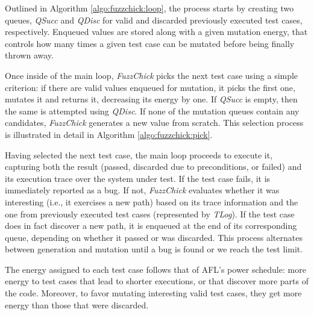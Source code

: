 \documentclass[sigconf, anonymous]{acmart}
\newcommand{\fuzzchick}{\textit{FuzzChick}\xspace}
\begin{document}
Outlined in Algorithm \ref{algo:fuzzchick:loop}, the process starts by creating
two queues, \textit{QSucc} and \textit{QDisc} for valid and discarded previously
executed test cases, respectively.
%
Enqueued values are stored along with a given mutation energy, that controls how
many times a given test case can be mutated before being finally thrown away.


Once inside of the main loop, \fuzzchick picks the next test case using a simple
criterion: if there are valid values enqueued for mutation, it picks the first
one, mutates it and returns it, decreasing its energy by one.
%
If \textit{QSucc} is empty, then the same is attempted using \textit{QDisc}.
%
If none of the mutation queues contain any candidates, \fuzzchick generates a
new value from scratch.
%
This selection process is illustrated in detail in Algorithm
\ref{algo:fuzzchick:pick}.


Having selected the next test case, the main loop proceeds to execute it,
capturing both the result (passed, discarded due to preconditions, or failed)
and its execution trace over the system under test.
%
If the test case fails, it is immediately reported as a bug.
%
If not, \fuzzchick evaluates whether it was interesting (i.e., it exercises a
new path) based on its trace information and the one from previously executed
test cases (represented by \textit{TLog}).
%
If the test case does in fact discover a new path, it is enqueued at the end of
its corresponding queue, depending on whether it passed or was discarded.
%
%
This process alternates between generation and mutation until a bug is found or
we reach the test limit.


The energy assigned to each test case follows that of AFL's power schedule: more
energy to test cases that lead to shorter executions, or that discover more
parts of the code.
%
Moreover, to favor mutating interesting valid test cases, they get more energy
than those that were discarded.



\begin{algorithm}
  \SetInd{0em}{0.75em}
  \SetAlgoLined
  \DontPrintSemicolon
\caption{\label{algo:fuzzchick:loop}\fuzzchick Testing Loop}
\end{algorithm}
\end{document}
